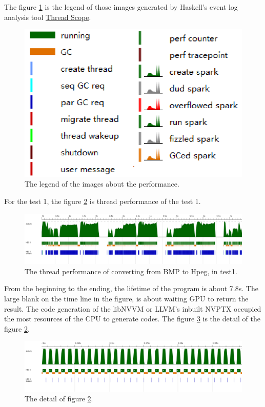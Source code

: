 \documentclass{article}
\begin{document}
The figure \ref{fig:final-thread-legend} is the legend of those images generated by Haskell's event log
analysis tool \href{http://www.haskell.org/haskellwiki/ThreadScope}{Thread Scope}.
\begin{figure}
\centering
\includegraphics{final-thread-legend}
\caption{The legend of the images about the performance.}
\label{fig:final-thread-legend}
\end{figure}

For the test 1, the figure \ref{fig:fin-test1.bh} is thread performance of the test 1.

\begin{figure}
    \centering
    \includegraphics[width=1\linewidth]{fin-test1.bh.png}
    \caption{The thread performance of converting from BMP to Hpeg, in test1.}
    \label{fig:fin-test1.bh}
\end{figure}

From the beginning to the ending, the lifetime of the program is about 7.8s.
The large blank on the time line in the figure, is about waiting GPU to return the result.
The code generation of the libNVVM or LLVM's inbuilt NVPTX occupied the most resources of the CPU
to generate codes.
The figure \ref{fig:fin-test1.bh-detail} is the detail of the figure \ref{fig:fin-test1.bh}.

\begin{figure}
\centering
\includegraphics[width=1\linewidth]{fin-test1.bh-detail1.png}
\caption{The detail of figure \ref{fig:fin-test1.bh}.}
\label{fig:fin-test1.bh-detail}
\end{figure}
\end{document}
